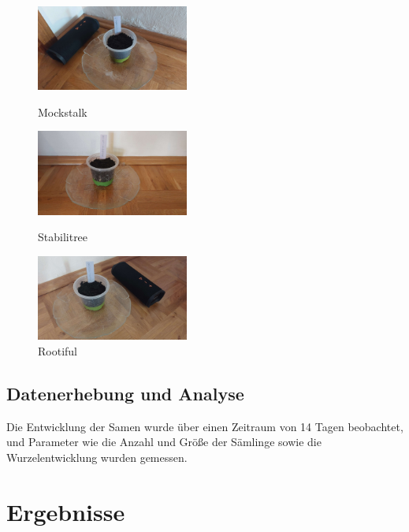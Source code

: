 \begin{figure} [H]
    \centering
    \begin{minipage}{.37\textwidth}
        \centering
        \includegraphics[width=5cm]{Pflanze_schlecht.jpg}
        \caption{Mockstalk}
        \label{fig:schlecht}
    \end{minipage}%
    \begin{minipage}{.37\textwidth}
        \centering
        \includegraphics[width=5cm]{Pflanze_normal.jpg}
        \caption{Stabilitree}
        \label{fig:normal}
    \end{minipage}%
    \begin{minipage}{.37\textwidth}
        \centering
        \includegraphics[width=5cm]{Pflanze_lob.jpg}
        \caption{Rootiful}
        \label{fig:gut}
    \end{minipage}
    \label{fig:alle_bilder}
\end{figure}


\subsection{Datenerhebung und Analyse}
Die Entwicklung der Samen wurde über einen Zeitraum von 14 Tagen beobachtet, und Parameter wie die Anzahl und Größe der Sämlinge sowie die Wurzelentwicklung wurden gemessen.

\pagebreak

\section{Ergebnisse}
